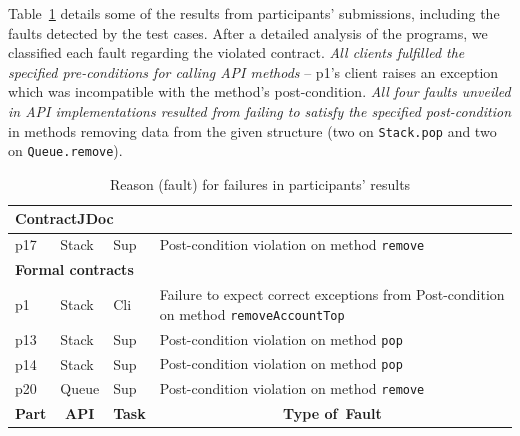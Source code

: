 Table~\ref{tab:faults} details some of the results from participants' submissions, including the faults detected by the test cases. After a detailed analysis of the programs, we classified each fault regarding the violated contract. 
\emph{All clients fulfilled the specified pre-conditions for calling API methods} -- p1's client raises an exception which was incompatible with the method's post-condition.
\emph{All four faults unveiled in API implementations resulted from failing to satisfy the specified post-condition} in methods removing data from the given structure (two on \texttt{Stack.pop} and two on \texttt{Queue.remove}).

\begin{table}
\centering
\caption{Reason (fault) for failures in participants' results}
\label{tab:faults}
\begin{adjustbox}{width=\textwidth}
\begin{tabular}{|l|l|l|l|} 
\hline
\multicolumn{4}{|l|}{\textbf{ContractJDoc }}                                                                                                                                                                    \\ 
\hline
p17                                        & Stack                             & Sup                                & Post-condition violation on method \texttt{remove}                                    \\ 
\hline
\multicolumn{4}{|l|}{\textbf{Formal contracts} }                                                                                                                                                                \\ 
\hline
p1                                         & Stack                             & Cli                                & Failure to expect correct exceptions from Post-condition on method \texttt{removeAccountTop}    \\ 
\hline
p13                                        & Stack                             & Sup                                & Post-condition violation on method \texttt{pop}     \\ 
\hline
p14                                        & Stack                             & Sup                                & Post-condition violation on method \texttt{pop}     \\ 
\hline
p20                                        & Queue                             & Sup                                & Post-condition violation on method \texttt{remove}  \\ 
\hline\hline
\multicolumn{1}{|c|}{\textbf{Part}} & \multicolumn{1}{c|}{\textbf{API}} & \multicolumn{1}{c|}{\textbf{Task}} & \multicolumn{1}{c|}{\textbf{Type of~Fault}}                                               \\
\hline
\end{tabular}
\end{adjustbox}
\end{table}

